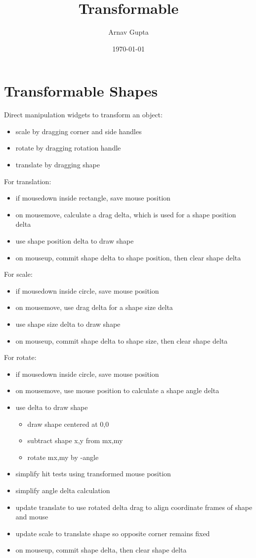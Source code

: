 \documentclass[11pt]{article}
\author{Arnav Gupta}
\date{\today}
\title{Transformable}
\begin{document}
\maketitle
\tableofcontents

\section{Transformable Shapes}
\label{sec:orgd15a6f3}
Direct manipulation widgets to transform an object:
\begin{itemize}
\item scale by dragging corner and side handles
\item rotate by dragging rotation handle
\item translate by dragging shape
\end{itemize}

For translation:
\begin{itemize}
\item if mousedown inside rectangle, save mouse position
\item on mousemove, calculate a drag delta, which is used for a shape position delta
\item use shape position delta to draw shape
\item on mouseup, commit shape delta to shape position, then clear shape delta
\end{itemize}

For scale:
\begin{itemize}
\item if mousedown inside circle, save mouse position
\item on mousemove, use drag delta for a shape size delta
\item use shape size delta to draw shape
\item on mouseup, commit shape delta to shape size, then clear shape delta
\end{itemize}

For rotate:
\begin{itemize}
\item if mousedown inside circle, save mouse position
\item on mousemove, use mouse position to calculate a shape angle delta
\item use delta to draw shape
\begin{itemize}
\item draw shape centered at 0,0
\item subtract shape x,y from mx,my
\item rotate mx,my by -angle
\end{itemize}
\item simplify hit tests using transformed mouse position
\item simplify angle delta calculation
\item update translate to use rotated delta drag to align coordinate frames of shape
and mouse
\item update scale to translate shape so opposite corner remains fixed
\item on mouseup, commit shape delta, then clear shape delta
\end{itemize}
\end{document}
